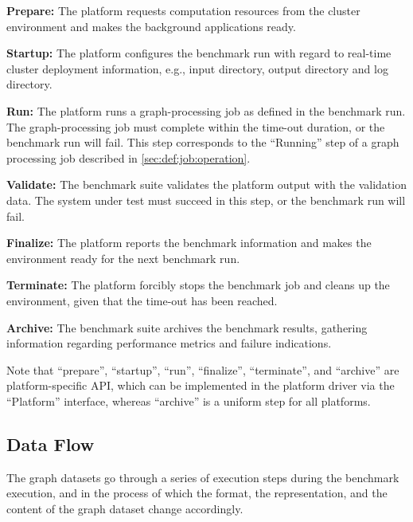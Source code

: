 \begin{enumerate}[label=\textbf{[\arabic*]}]
    \item \textbf{Prepare:} The platform requests computation resources from the cluster environment and makes the background applications ready.
    
    \item \textbf{Startup:} The platform configures the benchmark run with regard to real-time cluster deployment information, e.g., input directory, output directory and log directory.
    
    \item \textbf{Run:} The platform runs a graph-processing job as defined in the benchmark run. The graph-processing job must complete within the time-out duration, or the benchmark run will fail. This step corresponds to the ``Running'' step of a graph processing job described in \ref{sec:def:job:operation}.
    
    \item \textbf{Validate:} The benchmark suite validates the platform output with the validation data. The system under test must succeed in this step, or the benchmark run will fail.
    
    \item \textbf{Finalize:} The platform reports the benchmark information and makes the environment ready for the next benchmark run.
    
    \item \textbf{Terminate:} The platform forcibly stops the benchmark job and cleans up the environment, given that the time-out has been reached. 
    
    \item \textbf{Archive:} The benchmark suite archives the benchmark results, gathering information regarding performance metrics and failure indications.
\end{enumerate}

Note that ``prepare'', ``startup'', ``run'', ``finalize'', ``terminate'', and ``archive'' are platform-specific API, which can be implemented in the platform driver via the ``Platform'' interface, whereas ``archive'' is a uniform step for all platforms.  


\subsection{Data Flow}
\label{sec:process:execution:data_flow}
The graph datasets go through a series of execution steps during the benchmark execution, and in the process of which the format, the representation, and the content of the graph dataset change accordingly.

